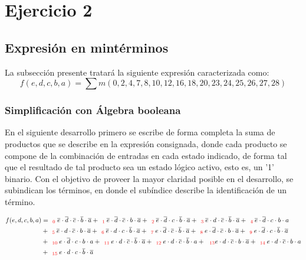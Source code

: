 \section{Ejercicio 2}

\newcommand{\subindex}[1]{_{\ \ \color{red} #1}}

\subsection{Expresi\'on en mint\'erminos}
La subsecci\'on presente tratar\'a la siguiente expresi\'on caracterizada como:
\begin{equation*}
    f(e,d,c,b,a) = \sum m(0,2,4,7,8,10,12,16,18,20,23,24,25,26,27,28)
\end{equation*}


\subsubsection{Simplificación con Álgebra booleana}
En el siguiente desarrollo primero se escribe de forma completa la suma de productos que se describe en la expresi\'on
consignada, donde cada producto se compone de la combinaci\'on de entradas en cada estado indicado, de forma tal que el resultado 
de tal producto sea un estado l\'ogico activo, esto es, un '1' binario. Con el objetivo de proveer la mayor claridad posible en el desarrollo,
se subindican los t\'erminos, en donde el sub\'indice describe la identificaci\'on de un t\'ermino.

\begin{align*}
f(e,d,c,b,a) & =  \subindex{0} {\overline{e} \cdot \overline{d} \cdot \overline{c} \cdot \overline{b} \cdot \overline{a}}
+ \subindex{1} {\overline{e} \cdot \overline{d} \cdot \overline{c} \cdot b \cdot \overline{a}} 
+ \subindex{2} {\overline{e} \cdot \overline{d}  \cdot c \cdot \overline{b} \cdot \overline{a}}  
+ \subindex{3} {\overline{e} \cdot d \cdot \overline{c} \cdot \overline{b} \cdot \overline{a}} 
+ \subindex{4} {\overline{e} \cdot \overline{d} \cdot c \cdot b \cdot a} \\
& + \subindex{5} {\overline{e} \cdot d \cdot \overline{c} \cdot b \cdot \overline{a}} 
+ \subindex{6} {\overline{e} \cdot d \cdot c \cdot \overline{b} \cdot \overline{a}}
+ \subindex{7} {e \cdot \overline{d} \cdot \overline{c} \cdot \overline{b} \cdot \overline{a}} 
+ \subindex{8} {e \cdot \overline{d} \cdot \overline{c} \cdot b \cdot \overline{a}}
+ \subindex{9} {e \cdot \overline{d} \cdot c \cdot \overline{b} \cdot \overline{a}} \\
& + \subindex{10} {e \cdot \overline{d} \cdot c \cdot b \cdot a}
+ \subindex{11} {e \cdot d \cdot \overline{c} \cdot \overline{b} \cdot \overline{a}}
+ \subindex{12} {e \cdot d \cdot \overline{c} \cdot \overline{b} \cdot a} 
+ {\subindex{13} e \cdot d \cdot \overline{c} \cdot b \cdot \overline{a}} 
+ \subindex{14} {e \cdot d \cdot \overline{c} \cdot b \cdot a} \\
& + \subindex{15} {e \cdot d \cdot c \cdot \overline{b} \cdot \overline{a}}
\end{align*}

